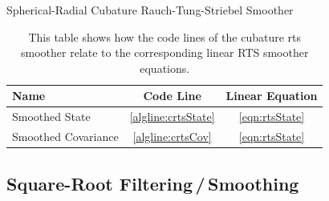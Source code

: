 		\begin{algorithm}  \DontPrintSemicolon
			\caption{Spherical-Radial Cubature Rauch-Tung-Striebel Smoother}
			\label{alg:cubatureRtsSmoother}
		\end{algorithm}
		\begin{table}
			\centering
			\begin{tabular}{l|c|c}
				\textbf{Name}       &   \textbf{Code Line}    & \textbf{Linear Equation} \\ \hline
				Smoothed State      & \ref{algline:crtsState} &   \eqref{eqn:rtsState}   \\
				Smoothed Covariance &  \ref{algline:crtsCov}  &   \eqref{eqn:rtsState}
			\end{tabular}
			\caption[Correspondence between the cubature and non-cubature RTS filter]{This table shows how the code lines of the cubature \ac{rts} smoother relate to the corresponding linear RTS smoother equations.}
			\label{tab:cubatureRtsSmoother}
		\end{table}

	\subsection{Square-Root Filtering\,/\,Smoothing}
		\label{subsec:sqrtSmoothing}

